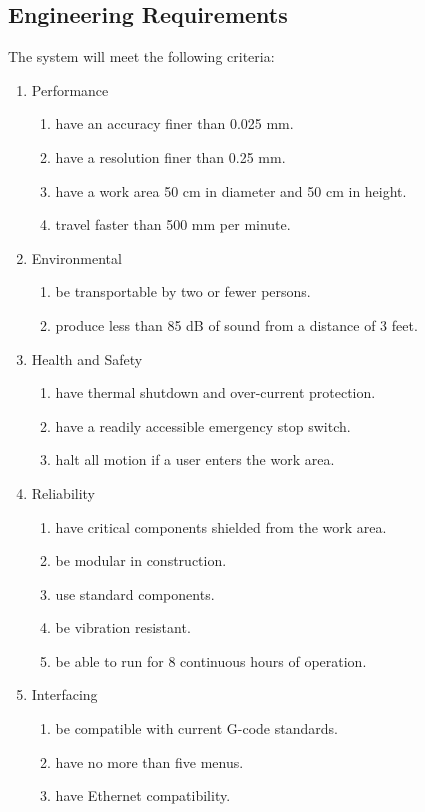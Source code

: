 \documentclass[11pt]{report}
\begin{document}
\subsection{Engineering Requirements}
The system will meet the following criteria:
\begin{enumerate} \parskip2pt
	\item Performance
	\begin{enumerate}
		\item have an accuracy finer than 0.025 mm.
		\item have a resolution finer than 0.25 mm.
		\item have a work area 50 cm in diameter and 50 cm in height.
		\item travel faster than 500 mm per minute.
	\end{enumerate}

	\item Environmental
	\begin{enumerate}
		\item be transportable by two or fewer persons.
		\item produce less than 85 dB of sound from a distance of 3 feet.
	\end{enumerate}

	\item Health and Safety
	\begin{enumerate}
		\item have thermal shutdown and over-current protection.
		\item have a readily accessible emergency stop switch.
		\item halt all motion if a user enters the work area.
	\end{enumerate}

	\item Reliability
	\begin{enumerate}
		\item have critical components shielded from the work area.
		\item be modular in construction.
		\item use standard components.
		\item be vibration resistant.
		\item be able to run for 8 continuous hours of operation.
	\end{enumerate}

	\item Interfacing
	\begin{enumerate}
		\item be compatible with current G-code standards.
		\item have no more than five menus.
		\item have Ethernet compatibility.
	\end{enumerate}
\end{enumerate}
\end{document}
